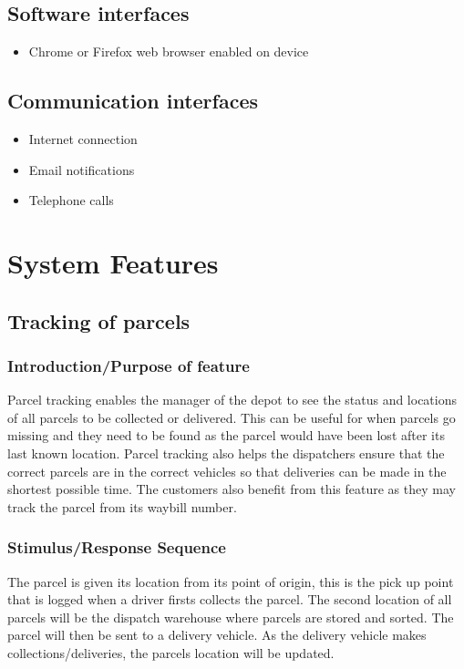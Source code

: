\documentclass[paper=a4, fontsize=11pt]{scrartcl} %
\numberwithin{equation}{section} %
\numberwithin{figure}{section} %
\numberwithin{table}{section} %
\begin{document}
\subsection{Software interfaces}
	\begin{itemize}
		\item Chrome or Firefox web browser enabled on device
	\end{itemize}
\subsection{Communication interfaces}
	\begin{itemize}
		\item Internet connection
		\item Email notifications
		\item Telephone calls
	\end{itemize}

\section{System Features}


\subsection{Tracking of parcels}
\subsubsection{Introduction/Purpose of feature}

Parcel tracking enables the manager of the depot to see the status and locations of all parcels to be collected or delivered. This can be useful for when parcels go missing and they need to be found as the parcel would have been lost after its last known location. Parcel tracking also helps the dispatchers ensure that the correct parcels are in the correct vehicles so that deliveries can be made in the shortest possible time. The customers also benefit from this feature as they may track the parcel from its waybill number.
\subsubsection{Stimulus/Response Sequence}
The parcel is given its location  from its point of origin, this is the pick up point that is logged when a driver firsts collects the parcel. The second location of all parcels will be the dispatch warehouse where parcels are stored and sorted. The parcel will then be sent to a delivery vehicle. As the delivery vehicle makes collections/deliveries, the parcels location will be updated. 
\end{document}
